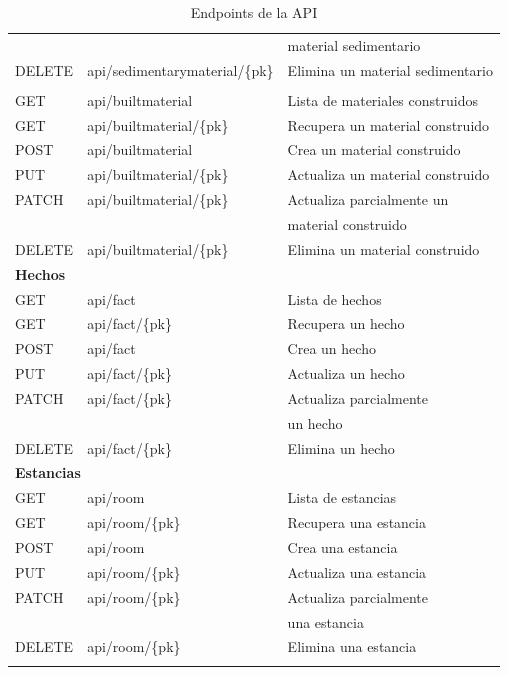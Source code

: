 \begin{longtable}[H]{|l|l|l|}
    &  & material sedimentario \\
    DELETE & api/sedimentarymaterial/\{pk\} & Elimina un material sedimentario \\
    \hline\hline
    \newpage \multicolumn{3}{|l|}{\textbf{Materiales construidos}} \\
    \hline
    GET & api/builtmaterial & Lista de materiales construidos \\
    GET & api/builtmaterial/\{pk\} & Recupera un material construido \\
    POST & api/builtmaterial & Crea un material construido \\
    PUT & api/builtmaterial/\{pk\} & Actualiza un material construido \\
    PATCH & api/builtmaterial/\{pk\} & Actualiza parcialmente un \\
    &  & material construido \\
    DELETE & api/builtmaterial/\{pk\} & Elimina un material construido \\
    \hline\hline
    \multicolumn{3}{|l|}{\textbf{Hechos}} \\
    \hline
    GET & api/fact & Lista de hechos \\
    GET & api/fact/\{pk\} & Recupera un hecho \\
    POST & api/fact & Crea un hecho \\
    PUT & api/fact/\{pk\} & Actualiza un hecho \\
    PATCH & api/fact/\{pk\} & Actualiza parcialmente \\
    &  & un hecho \\
    DELETE & api/fact/\{pk\} & Elimina un hecho \\
    \hline\hline
    \multicolumn{3}{|l|}{\textbf{Estancias}} \\
    \hline
    GET & api/room & Lista de estancias \\
    GET & api/room/\{pk\} & Recupera una estancia \\
    POST & api/room & Crea una estancia \\
    PUT & api/room/\{pk\} & Actualiza una estancia \\
    PATCH & api/room/\{pk\} & Actualiza parcialmente \\
    &  & una estancia \\
    DELETE & api/room/\{pk\} & Elimina una estancia \\
    \hline

    \caption{Endpoints de la API}
    \label{tab:endpoints}
\end{longtable}

